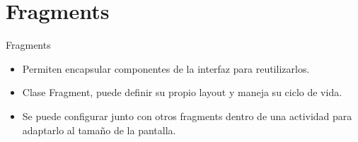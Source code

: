 \section{Fragments}
\begin{frame}{Fragments}
    \begin{itemize}
        \item {
            Permiten encapsular componentes de la interfaz para reutilizarlos. \pause
        }
        \item <2->{
            Clase Fragment, puede definir su propio layout y maneja su ciclo de vida.
        }
        \item <3->{
            Se puede configurar junto con otros fragments dentro de una actividad para adaptarlo al tamaño de la pantalla.
        }
    \end{itemize}
\end{frame}
